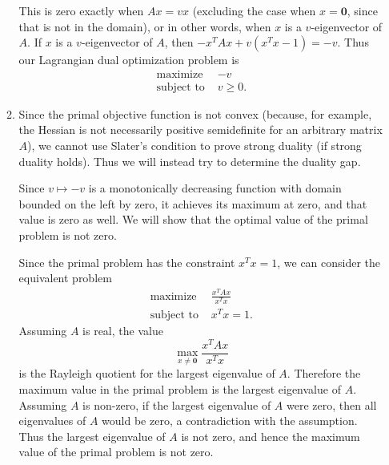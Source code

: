 \documentclass{article}
\newcommand{\0}{\mathbf{0}}
\begin{document}
\begin{enumerate}
\begin{enumerate}
    This is zero exactly when $Ax = vx$ (excluding the case when $x = \0$, since that is not in the domain), or in other words, when $x$ is a $v$-eigenvector of $A$.
    If $x$ is a $v$-eigenvector of $A$, then $-x^T A x + v \left(x^T x - 1\right) = -v$.
    Thus our Lagrangian dual optimization problem is
    \begin{align*}
      \text{maximize } & -v \\
      \text{subject to } & v \geq 0.
    \end{align*}
  \item
    Since the primal objective function is not convex (because, for example, the Hessian is not necessarily positive semidefinite for an arbitrary matrix $A$), we cannot use Slater's condition to prove strong duality (if strong duality holds).
    Thus we will instead try to determine the duality gap.

    Since $v \mapsto -v$ is a monotonically decreasing function with domain bounded on the left by zero, it achieves its maximum at zero, and that value is zero as well.
    We will show that the optimal value of the primal problem is not zero.

    Since the primal problem has the constraint $x^T x = 1$, we can consider the equivalent problem
    \begin{align*}
      \text{maximize } & \frac{x^T A x}{x^T x} \\
      \text{subject to } & x^T x = 1.
    \end{align*}
    Assuming $A$ is real, the value
    \begin{equation*}
      \max_{x \neq \0} \frac{x^T A x}{x^T x}
    \end{equation*}
    is the Rayleigh quotient for the largest eigenvalue of $A$.
    Therefore the maximum value in the primal problem is the largest eigenvalue of $A$.
    Assuming $A$ is non-zero, if the largest eigenvalue of $A$ were zero, then all eigenvalues of $A$ would be zero, a contradiction with the assumption.
    Thus the largest eigenvalue of $A$ is not zero, and hence the maximum value of the primal problem is not zero.


\end{enumerate}
\end{enumerate}
\end{document}
